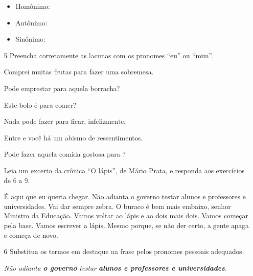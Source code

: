 \begin{itemize}
\item Homônimo: 
\item Antônimo: 
\item Sinônimo: 
\end{itemize}

\num{5} Preencha corretamente as lacunas com os pronomes ``eu'' ou
``mim''.

\begin{escolha}
\item Comprei muitas frutas para  fazer uma sobremesa.
\item Pode emprestar para  aquela borracha?
\item Este bolo é para  comer?
\item Nada pode fazer para  ficar, infelizmente.
\item Entre  e você há um abismo de ressentimentos.
\item Pode fazer aquela comida gostosa para ?
\end{escolha}

Leia um excerto da crônica ``O lápis'', de Mário Prata, e responda aos
exercícios de 6 a 9.

\begin{myquote}
É aqui que eu queria chegar. Não adianta o governo testar alunos e
professores e universidades. Vai dar sempre zebra. O buraco é bem mais
embaixo, senhor Ministro da Educação. Vamos voltar ao lápis e ao dois
mais dois. Vamos começar pela base. Vamos escrever a lápis. Mesmo
porque, se não der certo, a gente apaga e começa de novo.

\end{myquote}

\num{6} Substitua os termos em destaque na frase pelos pronomes pessoais
adequados.

\smallskip

\noindent\small\emph{Não adianta \textbf{o governo} testar \textbf{alunos e professores e
universidades}}.

\normalsize

